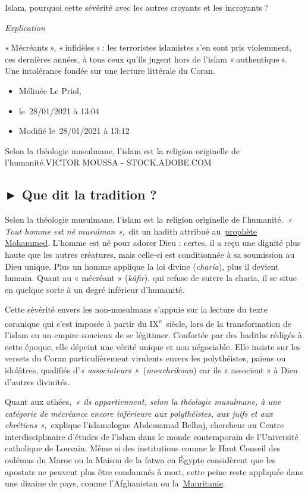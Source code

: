 Islam, pourquoi cette sévérité avec les autres croyants et les
incroyants ?

\emph{Explication~}

« Mécréants », « infidèles » : les terroristes islamistes s'en sont pris
violemment, ces dernières années, à tous ceux qu'ils jugent hors de
l'islam « authentique ». Une intolérance fondée sur une lecture
littérale du Coran. 

\begin{itemize}
\item
  Mélinée Le Priol,~
\item
  le~28/01/2021 à 13:04~
\item
  Modifié le~28/01/2021 à 13:12
\end{itemize}

Selon la théologie musulmane, l'islam est la religion originelle de
l'humanité.VICTOR MOUSSA - STOCK.ADOBE.COM

\subsection{► Que dit la tradition ?}

Selon la théologie musulmane, l'islam est la religion originelle de
l'humanité.~\emph{« Tout homme est né musulman »,}~dit un hadith
attribué
au~\href{https://www.la-croix.com/sacralite-prophete-lislam-2020-11-06-1101123195}{\underline{prophète
Mohammed}}. L'homme est né pour adorer Dieu : certes, il a reçu une
dignité plus haute que les autres créatures, mais celle-ci est
conditionnée à sa soumission au Dieu unique. Plus un homme applique la
loi divine (\emph{charia}), plus il devient humain. Quant au « mécréant
» (\emph{kâfir}), qui refuse de suivre la charia, il se situe en quelque
sorte à un degré inférieur d'humanité.

Cette sévérité envers les non-musulmans s'appuie sur la lecture du texte
coranique qui s'est imposée à partir du IX\textsuperscript{e}~siècle,
lors de la transformation de l'islam en un empire soucieux de se
légitimer. Confortée par des hadiths rédigés à cette époque, elle
dépeint une vérité unique et non négociable. Elle insiste sur les
versets du Coran particulièrement virulents envers les polythéistes,
païens ou idolâtres, qualifiés d'\emph{« associateurs
»}~(\emph{mouchrikoun}) car ils « associent » à Dieu d'autres divinités.

Quant aux athées,~\emph{« ils appartiennent, selon la théologie
musulmane, à une catégorie de mécréance encore inférieure aux
polythéistes, aux juifs et aux chrétiens »,~}explique l'islamologue
Abdessamad Belhaj, chercheur au Centre interdisciplinaire d'études de
l'islam dans le monde contemporain de l'Université catholique de
Louvain. Même si des institutions comme le Haut Conseil des oulémas du
Maroc ou la Maison de la fatwa en Égypte considèrent que les apostats ne
peuvent plus être condamnés à mort, cette peine reste appliquée dans une
dizaine de pays, comme l'Afghanistan ou
la~\href{https://www.la-croix.com/Monde/Afrique/prisons-Mauritanie-calvaire-dun-apostat-2019-09-30-1201051050}{\underline{Mauritanie}}.

